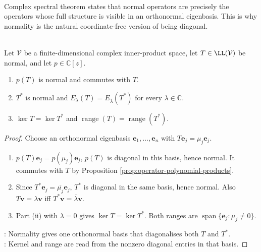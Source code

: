 \begin{perspective} \label{per:normal-operators-coordinate-free-diagonal} \\
Complex spectral theorem states that normal operators are precisely the operators whose full structure is visible in an orthonormal eigenbasis. This is why normality is the natural coordinate-free version of being diagonal.
\end{perspective}

\begin{proposition} \label{prop:normal-polynomial-kernel-range-properties} \\
Let $\mathcal{V}$ be a finite-dimensional complex inner-product space, let $T\in\LL(\mathcal{V})$ be normal, and let $p\in\mathbb{C}[z]$.
\begin{enumerate}[label=(\roman*)]
\setlength{\itemsep}{0pt}
\item $p(T)$ is normal and commutes with $T$.
\item $T^*$ is normal and $E_{\lambda}(T)=E_{\overline{\lambda}}(T^*)$ for every $\lambda\in\mathbb{C}$.
\item $\ker T=\ker T^*$ and $\operatorname{range}(T)=\operatorname{range}(T^*)$.
\end{enumerate}
\begin{proof}
Choose an orthonormal eigenbasis $\mathbf{e}_1,\ldots,\mathbf{e}_n$ with $T\mathbf{e}_j=\mu_j\mathbf{e}_j$.
\begin{enumerate}[label=(\roman*)]
\setlength{\itemsep}{0pt}
\item $p(T)\mathbf{e}_j=p(\mu_j)\mathbf{e}_j$, $p(T)$ is diagonal in this basis, hence normal. It commutes with $T$ by Proposition \ref{prop:operator-polynomial-products}.
\item Since $T^*\mathbf{e}_j=\overline{\mu_j}\mathbf{e}_j$, $T^*$ is diagonal in the same basis, hence normal. Also $T\mathbf{v}=\lambda\mathbf{v}$ iff $T^*\mathbf{v}=\overline{\lambda}\mathbf{v}$.
\item Part (ii) with $\lambda=0$ gives $\ker T=\ker T^*$. Both ranges are $\operatorname{span}\{\mathbf{e}_j:\mu_j\neq0\}$.
\end{enumerate}
: Normality gives one orthonormal basis that diagonalises both $T$ and $T^*$.\\
: Kernel and range are read from the nonzero diagonal entries in that basis.
\end{proof}
\end{proposition}

